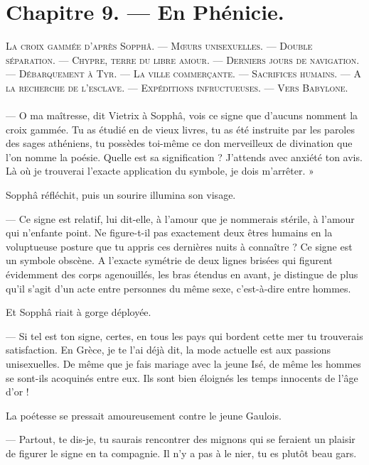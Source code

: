 \documentclass[a4paper, 11pt, oneside, polutonikogreek, french]{article}
\begin{document}
\section{Chapitre 9. --- En Phénicie.}
\begin{center}
\scshape
\small
La croix gammée d'après Sopphâ. --- Mœurs unisexuelles. --- Double séparation. --- Chypre, terre du libre amour. --- Derniers jours de navigation. --- Débarquement à Tyr. --- La ville commerçante. --- Sacrifices humains. --- A la recherche de l'esclave. --- Expéditions infructueuses. --- Vers Babylone.
\end{center}
\paragraph{}
--- O ma maîtresse, dit Vietrix à Sopphâ, vois ce signe que d'aucuns nomment la croix gammée. Tu as étudié en de vieux livres, tu as été instruite par les paroles des sages athéniens, tu possèdes toi-même ce don merveilleux de divination que l'on nomme la poésie. Quelle est sa signification ? J'attends avec anxiété ton avis. Là où je trouverai l'exacte application du symbole, je dois m'arrêter. »

Sopphâ réfléchit, puis un sourire illumina son visage.

--- Ce signe est relatif, lui dit-elle, à l'amour que je nommerais stérile, à l'amour qui n'enfante point. Ne figure-t-il pas exactement deux êtres humains en la voluptueuse posture que tu appris ces dernières nuits à connaître ? Ce signe est un symbole obscène. A l'exacte symétrie de deux lignes brisées qui figurent évidemment des corps agenouillés, les bras étendus en avant, je distingue de plus qu'il s'agit d'un acte entre personnes du même sexe, c'est-à-dire entre hommes.

Et Sopphâ riait à gorge déployée.

--- Si tel est ton signe, certes, en tous les pays qui bordent cette mer tu trouverais satisfaction. En Grèce, je te l'ai déjà dit, la mode actuelle est aux passions unisexuelles. De même que je fais mariage avec la jeune Isé, de même les hommes se sont-ils acoquinés entre eux. Ils sont bien éloignés les temps innocents de l'âge d'or !

La poétesse se pressait amoureusement contre le jeune Gaulois.

--- Partout, te dis-je, tu saurais rencontrer des mignons qui se feraient un plaisir de figurer le signe en ta compagnie. Il n'y a pas à le nier, tu es plutôt beau gars.
\end{document}
